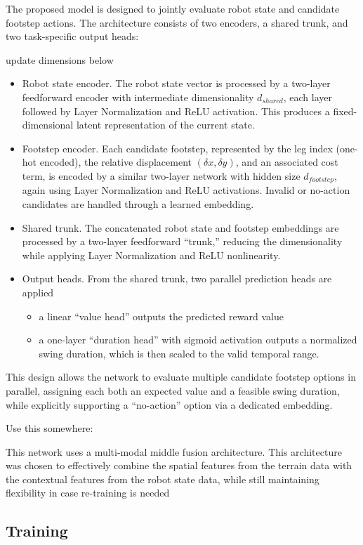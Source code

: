 The proposed model is designed to jointly evaluate robot state and
candidate footstep actions. The architecture consists of two
encoders, a shared trunk, and two task-specific output heads:
\begin{todo}
  update dimensions below
\end{todo}
\begin{itemize}
  \item Robot state encoder. The robot state vector is processed by a
    two-layer feedforward encoder with intermediate dimensionality
    $d_{shared}$, each layer followed by Layer Normalization and ReLU
    activation.
    This produces a fixed-dimensional latent representation of the
    current state.
  \item Footstep encoder. Each candidate footstep, represented by the leg
    index (one-hot encoded), the relative displacement
    $(\delta x, \delta y)$, and an associated cost term, is encoded by a similar
    two-layer network with hidden size $d_{footstep}$, again using
    Layer Normalization and ReLU activations. Invalid or
    no-action candidates are handled through a learned embedding.
  \item Shared trunk. The concatenated robot state and footstep embeddings
    are processed by a two-layer feedforward “trunk,” reducing the
    dimensionality while applying Layer Normalization and ReLU nonlinearity.
  \item Output heads. From the shared trunk, two parallel prediction heads
    are applied

    \begin{itemize}
      \item a linear “value head” outputs the predicted reward
        value
      \item a one-layer “duration head” with sigmoid activation
        outputs a normalized swing duration, which is then scaled to the
        valid temporal range.
    \end{itemize}
\end{itemize}

This design allows the network to evaluate multiple candidate
footstep options in parallel, assigning each both an expected value
and a feasible swing duration, while explicitly supporting a
“no-action” option via a dedicated embedding.

\begin{todo}
  Use this somewhere:

  This network uses a multi-modal middle fusion
  architecture. This architecture was chosen to effectively combine the
  spatial features from the terrain data with the contextual features
  from the robot state data, while still maintaining flexibility in
  case re-training is needed \cite{feng2021deep}
\end{todo}

\subsection{Training}
